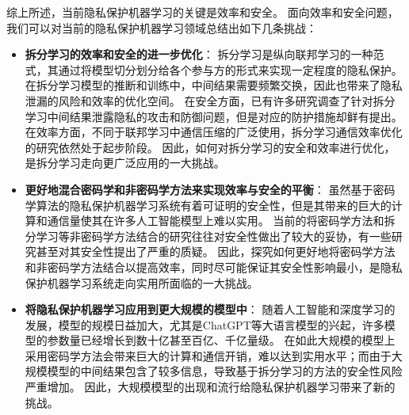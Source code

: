 综上所述，当前隐私保护机器学习的关键是效率和安全。
面向效率和安全问题，我们可以对当前的隐私保护机器学习领域总结出如下几条挑战：
\begin{itemize}
    \item \textbf{拆分学习的效率和安全的进一步优化}：
    拆分学习是纵向联邦学习的一种范式，其通过将模型切分划分给各个参与方的形式来实现一定程度的隐私保护。
    在拆分学习模型的推断和训练中，中间结果需要频繁交换，因此也带来了隐私泄漏的风险和效率的优化空间。
    在安全方面，已有许多研究调查了针对拆分学习中间结果泄露隐私的攻击和防御问题，但是对应的防护措施却鲜有提出。
    在效率方面，不同于联邦学习中通信压缩的广泛使用，拆分学习通信效率优化的研究依然处于起步阶段。
    因此，如何对拆分学习的安全和效率进行优化，是拆分学习走向更广泛应用的一大挑战。

    \item \textbf{更好地混合密码学和非密码学方法来实现效率与安全的平衡}：
    虽然基于密码学算法的隐私保护机器学习系统有着可证明的安全性，但是其带来的巨大的计算和通信量使其在许多人工智能模型上难以实用。
    当前的将密码学方法和拆分学习等非密码学方法结合的研究往往对安全性做出了较大的妥协，有一些研究甚至对其安全性提出了严重的质疑。
    因此，探究如何更好地将密码学方法和非密码学方法结合以提高效率，同时尽可能保证其安全性影响最小，是隐私保护机器学习系统走向实用所面临的一大挑战。

    \item \textbf{将隐私保护机器学习应用到更大规模的模型中}：
    随着人工智能和深度学习的发展，模型的规模日益加大，尤其是ChatGPT等大语言模型的兴起，许多模型的参数量已经增长到数十亿甚至百亿、千亿量级。
    在如此大规模的模型上采用密码学方法会带来巨大的计算和通信开销，难以达到实用水平；而由于大规模模型的中间结果包含了较多信息，导致基于拆分学习的方法的安全性风险严重增加。
    因此，大规模模型的出现和流行给隐私保护机器学习带来了新的挑战。
\end{itemize}


